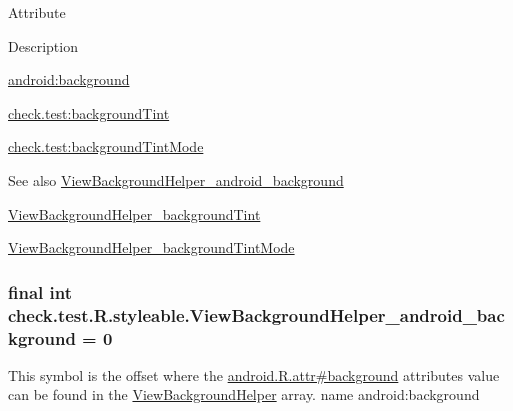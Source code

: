 Attribute

Description 

{\ttfamily \hyperlink{classcheck_1_1test_1_1_r_1_1styleable_aa2313bf1378b158e67edf755744cb72f}{android\+:background}}

{\ttfamily \hyperlink{classcheck_1_1test_1_1_r_1_1styleable_a0d48384e17b37e236f9349fd6ec90051}{check.\+test\+:background\+Tint}}

{\ttfamily \hyperlink{classcheck_1_1test_1_1_r_1_1styleable_a45ca8f11081793216f1476f206f628e7}{check.\+test\+:background\+Tint\+Mode}}

\begin{DoxySeeAlso}{See also}
\hyperlink{classcheck_1_1test_1_1_r_1_1styleable_aa2313bf1378b158e67edf755744cb72f}{View\+Background\+Helper\+\_\+android\+\_\+background} 

\hyperlink{classcheck_1_1test_1_1_r_1_1styleable_a0d48384e17b37e236f9349fd6ec90051}{View\+Background\+Helper\+\_\+background\+Tint} 

\hyperlink{classcheck_1_1test_1_1_r_1_1styleable_a45ca8f11081793216f1476f206f628e7}{View\+Background\+Helper\+\_\+background\+Tint\+Mode} 
\end{DoxySeeAlso}
\hypertarget{classcheck_1_1test_1_1_r_1_1styleable_aa2313bf1378b158e67edf755744cb72f}{}
\subsubsection[{View\+Background\+Helper\+\_\+android\+\_\+background}]{\setlength{\rightskip}{0pt plus 5cm}final int check.\+test.\+R.\+styleable.\+View\+Background\+Helper\+\_\+android\+\_\+background = 0\hspace{0.3cm}{\ttfamily [static]}}\label{classcheck_1_1test_1_1_r_1_1styleable_aa2313bf1378b158e67edf755744cb72f}
This symbol is the offset where the \hyperlink{}{android.\+R.\+attr\#background} attribute\textquotesingle{}s value can be found in the \hyperlink{classcheck_1_1test_1_1_r_1_1styleable_ae6adc75d344e9e404acc591e2de26ff7}{View\+Background\+Helper} array.  name android\+:background \hypertarget{classcheck_1_1test_1_1_r_1_1styleable_a0d48384e17b37e236f9349fd6ec90051}{}
